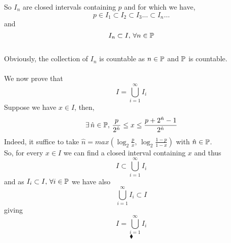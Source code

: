 So $I_n$  are closed intervals containing $p$ and for which we have,
$$p\in I_1\subset I_2\subset I_3\dots \subset I_n\dots $$
and 
$$I_n\subset I,\, \forall n\in \mathbb{P}$$\\
Obviously, the collection of $I_n$ is countable as $n\in \mathbb{P}$ and $\mathbb{P}$ is countable.
\\\\
We now prove that 
$$I=\bigcup^{\infty}_{i=1}I_i $$
Suppose we have $x\in I$, then, $$\exists\, \hat{n}\in \mathbb{P},\, \frac{p}{2^{\hat{n}}}\leq x\leq \frac{p+2^{\hat{n}}-1}{2^{\hat{n}}}$$
Indeed, it suffice to take $\hat{n}= max(\log_2 \frac{p}{x},\, \log_2 \frac{1-p}{1-x})$ with $\hat{n}\in\mathbb{P}$.\\
So, for every $x\in I$ we can find a closed interval containing $x$ and thus $$I\subset  \bigcup^{\infty}_{i=1}I_i$$
and as $I_i\subset I,\, \forall i\in \mathbb{P}$ we have also 
$$\bigcup^{\infty}_{i=1}I_i\subset  I$$
giving
$$I=\bigcup^{\infty}_{i=1}I_i$$
$$\blacklozenge$$


